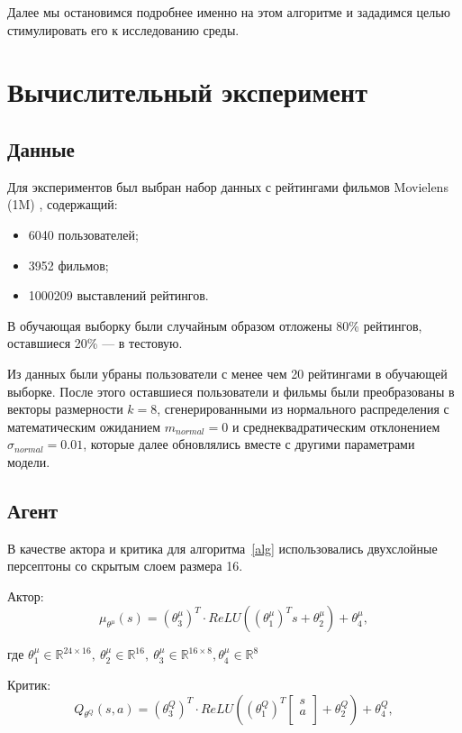 \documentclass[14pt]{extarticle}
\begin{document}
Далее мы остановимся подробнее именно на этом алгоритме и зададимся целью стимулировать его к исследованию среды.

\newpage

\section{Вычислительный эксперимент}

\subsection{Данные}

Для экспериментов был выбран набор данных с рейтингами фильмов Movielens (1M) \cite{ML_1M}, содержащий:

\begin{itemize}
    \item 6040 пользователей;
    \item 3952 фильмов;
    \item 1000209 выставлений рейтингов.
\end{itemize}

В обучающая выборку были случайным образом отложены 80\% рейтингов, оставшиеся 20\% --- в тестовую.

Из данных были убраны пользователи с менее чем 20 рейтингами в обучающей выборке. После этого оставшиеся пользователи и фильмы были преобразованы в векторы размерности $k=8$, сгенерированными из нормального распределения с математическим ожиданием $m_{normal}=0$ и среднеквадратическим отклонением $\sigma_{normal}=0.01$, которые далее обновлялись вместе с другими параметрами модели.

\subsection{Агент}

В качестве актора и критика для алгоритма~\ref{alg} использовались двухслойные персептоны со скрытым слоем размера 16.

Актор: $$\mu_{\theta^{\mu}}(s) = \left(\theta^{\mu}_{3}\right)^T \cdot ReLU\left(\left(\theta^{\mu}_{1}\right)^T s + \theta^{\mu}_2\right) + \theta^{\mu}_{4},$$

где $\theta^{\mu}_1 \in \mathbb{R}^{24\times16},\ \theta^{\mu}_2 \in \mathbb{R}^{16}, \ \theta^{\mu}_3 \in \mathbb{R}^{16\times 8}, \theta^{\mu}_4 \in \mathbb{R}^{8} $

Критик: $$Q_{\theta^{Q}}(s, a) = \left(\theta^{Q}_3\right)^T \cdot ReLU\left(\left(\theta^{Q}_1\right)^T \left[\begin{array}{c} 
s \\ a \\ 
\end{array}\right] + \theta^{Q}_2\right) + \theta^{Q}_4,$$
\end{document}
